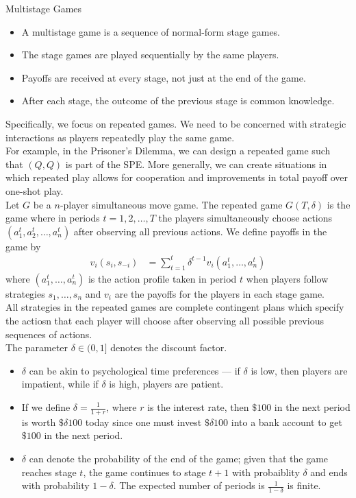 \documentclass[8pt]{extarticle}
\begin{document}
  \begin{problem}{Multistage Games}
    \begin{itemize}
      \item A multistage game is a sequence of normal-form stage games.
      \item The stage games are played sequentially by the same players.
      \item Payoffs are received at every stage, not just at the end of the game.
      \item After each stage, the outcome of the previous stage is common knowledge.
    \end{itemize}
    Specifically, we focus on repeated games. We need to be concerned with strategic interactions as players repeatedly play the same game.\\

    For example, in the Prisoner's Dilemma, we can design a repeated game such that $(Q,Q)$ is part of the SPE. More generally, we can create situations in which repeated play allows for cooperation and improvements in total payoff over one-shot play.\\

    Let $G$ be a $n$-player simultaneous move game. The repeated game $G(T,\delta)$ is the game where in periods $t = 1,2,\dots,T$ the players simultaneously choose actions $(a_1^t,a_2^t,\dots,a_n^t)$ after observing all previous actions. We define payoffs in the game by
    \begin{align*}
      v_i\left(s_i,s_{-i}\right) &= \sum_{t=1}^{t}\delta^{t-1}v_i(a_1^t,\dots,a_n^t)
    \end{align*}
    where $(a_1^t,\dots,a_n^t)$ is the action profile taken in period $t$ when players follow strategies $s_1,\dots,s_n$ and $v_i$ are the payoffs for the players in each stage game.\\

    All strategies in the repeated games are complete contingent plans which specify the actiosn that each player will choose after observing all possible previous sequences of actions.\\

    The parameter $\delta\in (0,1]$ denotes the discount factor.
    \begin{itemize}
      \item $\delta$ can be akin to psychological time preferences --- if $\delta$ is low, then players are impatient, while if $\delta$ is high, players are patient.
      \item If we define $\delta = \frac{1}{1+r}$, where $r$ is the interest rate, then $\$100$ in the next period is worth $\$\delta 100$ today since one must invest $\$\delta 100$ into a bank account to get $\$100$ in the next period.
      \item $\delta$ can denote the probability of the end of the game; given that the game reaches stage $t$, the game continues to stage $t+1$ with probaiblity $\delta$ and ends with probability $1-\delta$. The expected number of periods is $\frac{1}{1-\delta}$ is finite.
    \end{itemize}
  \end{problem}
\end{document}
